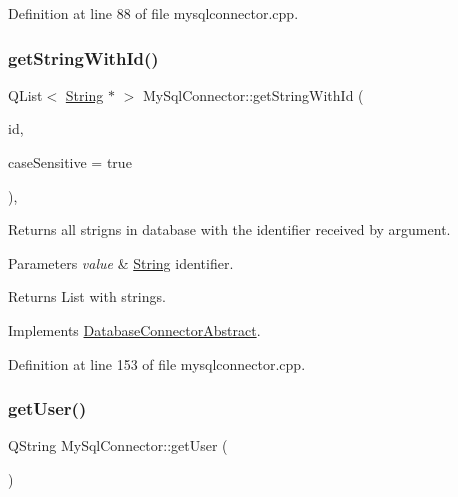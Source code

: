 Definition at line 88 of file mysqlconnector.\+cpp.

\mbox{\label{classMySqlConnector_a269bbced50451ff0ce48cfc4f2bb6a3b}} 
\subsubsection{\texorpdfstring{get\+String\+With\+Id()}{getStringWithId()}}
{\footnotesize\ttfamily Q\+List$<$ \mbox{\hyperlink{classString}{String}} $\ast$ $>$ My\+Sql\+Connector\+::get\+String\+With\+Id (\begin{DoxyParamCaption}\item[{const Q\+String \&}]{id,  }\item[{bool}]{case\+Sensitive = {\ttfamily true} }\end{DoxyParamCaption})\hspace{0.3cm}{\ttfamily [override]}, {\ttfamily [virtual]}}



Returns all strigns in database with the identifier received by argument. 


\begin{DoxyParams}{Parameters}
{\em value} & \mbox{\hyperlink{classString}{String}} identifier. \\
\hline
\end{DoxyParams}
\begin{DoxyReturn}{Returns}
List with strings. 
\end{DoxyReturn}


Implements \mbox{\hyperlink{classDatabaseConnectorAbstract_a757f25feaf50af012d25db8f27b1fef4}{Database\+Connector\+Abstract}}.



Definition at line 153 of file mysqlconnector.\+cpp.

\mbox{\label{classMySqlConnector_ae652c2a79321d979121e2347cbb25ba0}} 
\subsubsection{\texorpdfstring{get\+User()}{getUser()}}
{\footnotesize\ttfamily Q\+String My\+Sql\+Connector\+::get\+User (\begin{DoxyParamCaption}{ }\end{DoxyParamCaption})}



